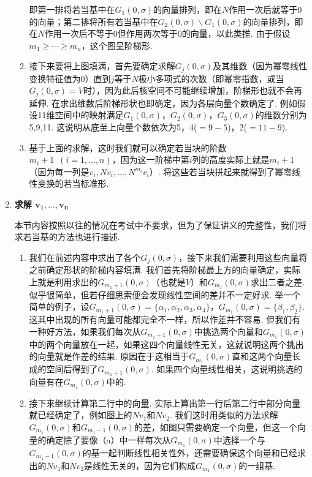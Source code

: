 \begin{enumerate}
\begin{enumerate}
                    即第一排将若当基中在$G_1(0,\sigma)$的向量排列，即在$N$作用一次后就等于0的向量；第二排将所有若当基中在$G_2(0,\sigma)\backslash G_1(0,\sigma)$的向量排列，即在$N$作用一次后不等于0但作用两次等于0的向量，以此类推. 由于假设$m_1\geqslant\cdots\geqslant m_n$，这个图呈阶梯形.

              \item 接下来要将上图填满，首先要确定求解$G_j(0,\sigma)$及其维数（因为幂零线性变换特征值为0）直到$j$等于$N$极小多项式的次数（即幂零指数，或当$G_j(0,\sigma)=V$时），因为此后核空间不可能继续增加，阶梯形也就不会再延伸. 在求出维数后阶梯形状也即确定，因为各层向量个数确定了. 例如假设11维空间中的映射满足$G_1(0,\sigma)$，$G_2(0,\sigma)$，$G_3(0,\sigma)$的维数分别为5,9,11. 这说明从底至上向量个数依次为5，4($=9-5$)，2($=11-9$).

              \item 基于上面的求解，这时我们就可以确定若当块的阶数$m_i+1\enspace(i=1,\ldots,n)$，因为这一阶梯中第$i$列的高度实际上就是$m_i+1$（因为每一列是$v_i,Nv_i,\ldots,N^{m_i}v_i$）. 将这些若当块拼起来就得到了幂零线性变换的若当标准形.
          \end{enumerate}

    \item \textbf{\heiti 求解 $\boldsymbol{v_1,\ldots,v_n}$}

          本节内容按照以往的情况在考试中不要求，但为了保证讲义的完整性，我们将求若当基的方法也进行描述.
          \begin{enumerate}
              \item 我们在前述内容中求出了各个$G_j(0,\sigma)$，接下来我们需要利用这些向量将之前确定形状的阶梯内容填满. 我们首先将阶梯最上方的向量确定，实际上就是利用求出的$G_{m_1+1}(0,\sigma)$（也就是$V$）和$G_{m_1}(0,\sigma)$求出二者之差. 似乎很简单，但若仔细思索便会发现线性空间的差并不一定好求. 举一个简单的例子，设$G_{m_1+1}(0,\sigma)=\{\alpha_1,\alpha_2,\alpha_3,\alpha_4\}$，$G_{m_1}(0,\sigma)=\{\beta_1,\beta_2\}$. 这其中出现的所有向量可能都完全不一样，所以作差并不容易. 但我们有一种好方法，如果我们每次从$G_{m_1+1}(0,\sigma)$中挑选两个向量和$G_{m_1}(0,\sigma)$中的两个向量放在一起，如果这四个向量线性无关，这就说明这两个挑出的向量就是作差的结果. 原因在于这相当于$G_{m_1}(0,\sigma)$直和这两个向量长成的空间后得到了$G_{m_1+1}(0,\sigma)$. 如果四个向量线性相关，这说明挑选的向量有在$G_{m_1}(0,\sigma)$中的.

              \item 接下来继续计算第二行中的向量. 实际上算出第一行后第二行中部分向量就已经确定了，例如图上的$Nv_1$和$Nv_2$. 我们这时用类似的方法求解$G_{m_1}(0,\sigma)$和$G_{m_1-1}(0,\sigma)$的差，如图只需要确定一个向量，但这一个向量的确定除了要像（a）中一样每次从$G_{m_1}(0,\sigma)$中选择一个与$G_{m_1-1}(0,\sigma)$的基一起判断线性相关性外，还需要确保这个向量和已经求出的$Nv_1$和$Nv_2$是线性无关的，因为它们构成$G_{m_1}(0,\sigma)$的一组基.


\end{enumerate}
\end{enumerate}

